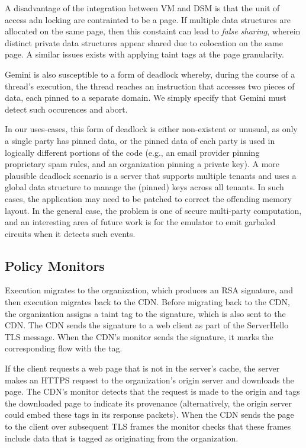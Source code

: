 %
A disadvantage of the integration between VM and DSM is that the unit of access
adn locking are contrainted to be a page.
%
If multiple data structures are allocated on the same page, then this constaint
can lead to \emph{false sharing}, wherein distinct private data structures
appear shared due to colocation on the same page.
%
A similar issues exists with applying taint tags at the page granularity.


Gemini is also susceptible to a form of deadlock whereby, during the course of
a thread's execution, the thread reaches an instruction that accesses two
pieces of data, each pinned to a separate domain.
%
We simply specify that Gemini must detect such occurences and abort.


In our uses-cases, this form of deadlock is either non-existent or unusual, as
only a single party has pinned data, or the pinned data of each party is used 
in logically different portions of the code (e.g., an email provider pinning
proprietary spam rules, and an organization pinning a private key).
%
A more plausible deadlock scenario is a server that supports multiple tenants
and uses a global data structure to manage the (pinned) keys across all
tenants.
%
In such cases, the application may need to be patched to correct the offending
memory layout.
%
In the general case, the problem is one of secure multi-party computation, and
an interesting area of future work is for the emulator to emit garbaled
circuits when it detects such events.


\subsection{Policy Monitors}


%
Execution migrates to the organization, which produces an RSA signature, and
then execution migrates back to the CDN\@.
%
Before migrating back to the CDN, the organization assigns a taint tag to the
signature, which is also sent to the CDN\@.
%
The CDN sends the signature to a web client as part of the ServerHello TLS
message.
%
When the CDN's monitor sends the signature, it marks the corresponding flow
with the tag.


If the client requests a web page that is not in the server's cache, the server
makes an HTTPS request to the organization's origin server and downloads the
page.
%
The CDN's monitor detects that the request is made to the origin and tags the
downloaded page to indicate its provenance (alternatively, the origin server
could embed these tags in its response packets).
%
When the CDN sends the page to the client over subsequent TLS frames the
monitor checks that these frames include data that is tagged as originating
from the organization. 


